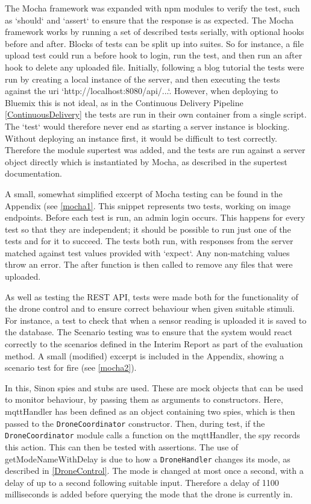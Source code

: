 \documentclass{article}
\begin{document}
The Mocha framework was expanded with npm modules to verify the test, such as `should` and `assert` to ensure that the response is as expected. The Mocha framework works by running a set of described tests serially, with optional hooks before and after. Blocks of tests can be split up into suites. So for instance, a file upload test could run a before hook to login, run the test, and then run an after hook to delete any uploaded file. Initially, following a blog tutorial\cite{thewayofcode} the tests were run by creating a local instance of the server, and then executing the tests against the uri `http://localhost:8080/api/...`. However, when deploying to Bluemix this is not ideal, as in the Continuous Delivery Pipeline \ref{ContinuousDelivery} the tests are run in their own container from a single script. The `test` would therefore never end as starting a server instance is blocking. Without deploying an instance first, it would be difficult to test correctly. Therefore the module supertest was added, and the tests are run against a server object directly which is instantiated by Mocha, as described in the supertest documentation\cite{supertest}.

A small, somewhat simplified excerpt of Mocha testing can be found in the Appendix (see \ref{mocha1}. This snippet represents two tests, working on image endpoints. Before each test is run, an admin login occurs. This happens for every test so that they are independent; it should be possible to run just one of the tests and for it to succeed. The tests both run, with responses from the server matched against test values provided with `expect`. Any non-matching values throw an error. The after function is then called to remove any files that were uploaded.  

As well as testing the REST API, tests were made both for the functionality of the drone control and to ensure correct behaviour when given suitable stimuli. For instance, a test to check that when a sensor reading is uploaded it is saved to the database. The Scenario testing was to ensure that the system would react correctly to the scenarios defined in the Interim Report as part of the evaluation method. A small (modified) excerpt is included in the Appendix, showing a scenario test for fire (see \ref{mocha2}).

In this, Sinon spies and stubs are used\cite{sinon}. These are mock objects that can be used to monitor behaviour, by passing them as arguments to constructors. Here, mqttHandler has been defined as an object containing two spies, which is then passed to the \texttt{DroneCoordinator} constructor. Then, during test, if the \texttt{DroneCoordinator} module calls a function on the mqttHandler, the spy records this action. This can then be tested with assertions. The use of getModeNameWithDelay is due to how a \texttt{DroneHandler} changes its mode, as described in \ref{DroneControl}. The mode is changed at most once a second, with a delay of up to a second following suitable input. Therefore a delay of 1100 milliseconds is added before querying the mode that the drone is currently in.
\end{document}
